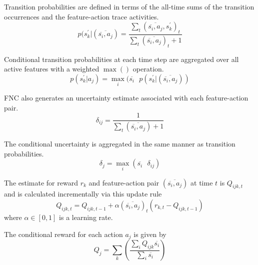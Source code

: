 Transition probabilities are defined in terms of the all-time
sums of the transition
occurrences and the feature-action trace activities.
\begin{equation}
p(s^\prime_k | (\overline{\overline{s_i}, a_j}) = \frac
{\sum_t (\overline{\overline{s_i}, a_j}, s^\prime_k)_t}
{\sum_t (\overline{\overline{s_i}, a_j})_t + 1}
\end{equation}

Conditional transition probabilities at each time step are aggregated
over all active features with a weighted $\max()$ operation.
\begin{equation}
p(s^\prime_k | a_j) = \max_i (\overline{s_i} \mbox{ }
p(s^\prime_k | (\overline{\overline{s_i}, a_j}))
\end{equation}

FNC also generates an uncertainty estimate associated with each feature-action
pair.
\begin{equation}
\delta_{ij} = \frac{1}{\sum_t(\overline{\overline{s_i}, a_j}) + 1}
\end{equation}

The conditional uncertainty is aggregated in the same manner as transition
probabilities.
\begin{equation}
\delta_j = \max_i (\overline{s_i} \mbox{ } \delta_{ij})
\end{equation}

The estimate for reward $r_k$ and feature-action pair
$(\overline{\overline{s_i}, a_j})$
at time $t$ is $Q_{ijk, t}$ and is calculated incrementally via this
update rule
\begin{equation}
Q_{ijk, t} = Q_{ijk, t-1} + \alpha
(\overline{\overline{s_i}, a_j})_t
(r_{k,t} - Q_{ijk, t-1})
\end{equation}
where $\alpha \in [0, 1]$ is a learning rate.

The conditional reward for each action $a_j$ is given by
\begin{equation}
Q_{j} = \sum_k \left ( \frac{\sum_i Q_{ijk} \overline{s_i}}
{\sum_i \overline{s_i}} \right )
\end{equation}
